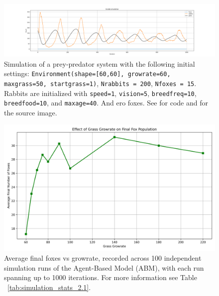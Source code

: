 \begin{figure}[!ht]
  \centering
  \includegraphics[width=0.9\linewidth]{images/Ecolab_simulation_no_foxes.png}
  \caption{Simulation of a prey-predator system with the following initial settings: \texttt{Environment(shape=[60,60], growrate=60, maxgrass=50, startgrass=1)}, \texttt{Nrabbits = 200}, \texttt{Nfoxes = 15}. Rabbits are initialized with \texttt{speed=1}, \texttt{vision=5}, \texttt{breedfreq=10}, \texttt{breedfood=10}, and \texttt{maxage=40}. And ero foxes. See \cite{youngaryantwo_initial_conditions_3d_separateICode} for code and \cite{youngaryantwo_initial_conditions_3d_3separateICode} for the source image.}
  \label{fig:Ecolab_pred_prey_no_foxes}
\end{figure}


\begin{figure}[!ht]
  \centering
  \includegraphics[width=0.9\linewidth]{images/avg_final_foxes_vs_growrate_100.png}
  \caption{
    Average final foxes vs growrate, recorded across 100 independent simulation runs of the Agent-Based Model (ABM), with each run spanning up to 1000 iterations. For more information see Table ~\ref{tab:simulation_stats_2.1}.
}
  \label{fig:avg_final_foxes_vs_growrate_100_2.1}
\end{figure}



